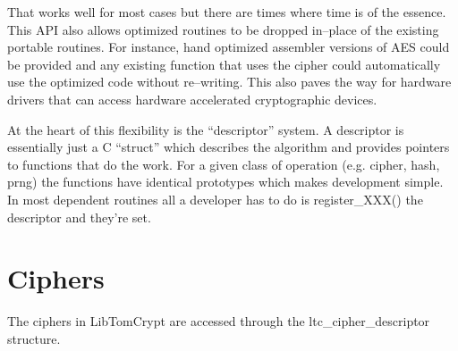 \documentclass[a4paper]{book}
\begin{document}
That works well for most cases but there are times where time is of the essence.  This API also allows optimized routines to be dropped in--place of the existing
portable routines.  For instance, hand optimized assembler versions of AES could be provided and any existing function that uses the cipher could automatically use
the optimized code without re--writing.  This also paves the way for hardware drivers that can access hardware accelerated cryptographic devices.

At the heart of this flexibility is the ``descriptor'' system.  A descriptor is essentially just a C ``struct'' which describes the algorithm and provides pointers
to functions that do the work.  For a given class of operation (e.g. cipher, hash, prng) the functions have identical prototypes which makes development simple.  In most
dependent routines all a developer has to do is register\_XXX() the descriptor and they're set.

\section{Ciphers}
The ciphers in LibTomCrypt are accessed through the ltc\_cipher\_descriptor structure.
\end{document}
